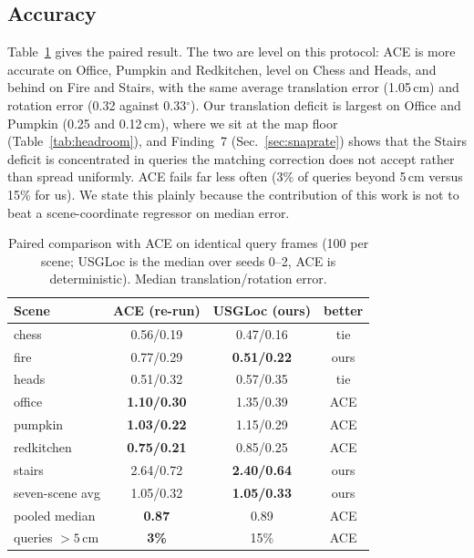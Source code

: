 \documentclass[journal]{IEEEtran}
\newcommand{\method}{USGLoc}
\begin{document}
\subsection{Accuracy}
Table~\ref{tab:ace} gives the paired result. The two are level on this protocol: ACE is more accurate on Office, Pumpkin and Redkitchen, level on Chess and Heads, and behind on Fire and Stairs, with the same average translation error (1.05\,cm) and rotation error (0.32 against 0.33$^\circ$). Our translation deficit is largest on Office and Pumpkin (0.25 and 0.12\,cm), where we sit at the map floor (Table~\ref{tab:headroom}), and Finding~7 (Sec.~\ref{sec:snaprate}) shows that the Stairs deficit is concentrated in queries the matching correction does not accept rather than spread uniformly. ACE fails far less often (3\% of queries beyond 5\,cm versus 15\% for us). We state
this plainly because the contribution of this work is not to beat a
scene-coordinate regressor on median error.

\begin{table}[t]
\caption{Paired comparison with ACE on identical query frames (100 per scene; \method{} is the median over seeds 0--2, ACE is deterministic). Median translation/rotation error.}
\label{tab:ace}
\centering\footnotesize
\setlength{\tabcolsep}{4pt}
\begin{tabular}{@{}lccc@{}}
\toprule
Scene & ACE (re-run) & \method{} (ours) & better \\
\midrule
chess      & 0.56/0.19 & 0.47/0.16 & tie \\
fire       & 0.77/0.29 & \textbf{0.51/0.22} & ours \\
heads      & 0.51/0.32 & 0.57/0.35 & tie \\
office     & \textbf{1.10/0.30} & 1.35/0.39 & ACE \\
pumpkin    & \textbf{1.03/0.22} & 1.15/0.29 & ACE \\
redkitchen & \textbf{0.75/0.21} & 0.85/0.25 & ACE \\
stairs     & 2.64/0.72 & \textbf{2.40/0.64} & ours \\
\midrule
seven-scene avg & 1.05/0.32 & \textbf{1.05/0.33} & ours \\
pooled median & \textbf{0.87} & 0.89 & ACE \\
queries $>5$\,cm & \textbf{3\%} & 15\% & ACE \\
\bottomrule
\end{tabular}
\end{table}
\end{document}
